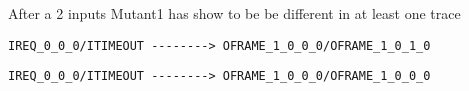\documentclass[11pt,a4paper]{article}
\begin{document}

After a 2 inputs Mutant1 has show to be be different in at least one trace

\begin{verbatim}
IREQ_0_0_0/ITIMEOUT --------> OFRAME_1_0_0_0/OFRAME_1_0_1_0
\end{verbatim}
\begin{verbatim}
IREQ_0_0_0/ITIMEOUT --------> OFRAME_1_0_0_0/OFRAME_1_0_0_0
\end{verbatim}
\end{document}
